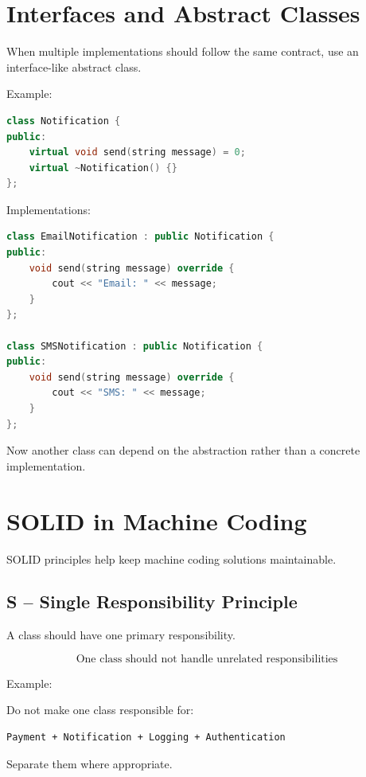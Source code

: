 \documentclass[12pt,a4paper]{article}
\begin{document}
\section{Interfaces and Abstract Classes}

When multiple implementations should follow the same contract, use an interface-like abstract class.

Example:

\begin{lstlisting}[language=C++]
class Notification {
public:
    virtual void send(string message) = 0;
    virtual ~Notification() {}
};
\end{lstlisting}

Implementations:

\begin{lstlisting}[language=C++]
class EmailNotification : public Notification {
public:
    void send(string message) override {
        cout << "Email: " << message;
    }
};

class SMSNotification : public Notification {
public:
    void send(string message) override {
        cout << "SMS: " << message;
    }
};
\end{lstlisting}

Now another class can depend on the abstraction rather than a concrete implementation.

\section{SOLID in Machine Coding}

SOLID principles help keep machine coding solutions maintainable.

\subsection{S -- Single Responsibility Principle}

A class should have one primary responsibility.

\[
\boxed{\text{One class should not handle unrelated responsibilities}}
\]

Example:

Do not make one class responsible for:

\begin{verbatim}
Payment + Notification + Logging + Authentication
\end{verbatim}

Separate them where appropriate.
\end{document}
